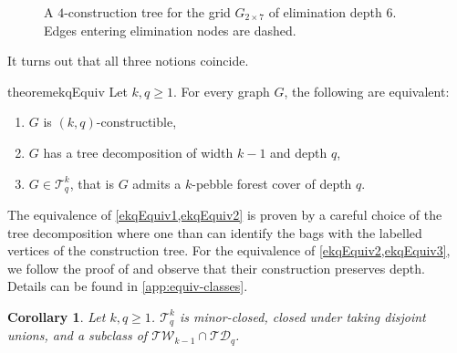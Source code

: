 \documentclass[10pt,a4paper]{article}
\newtheorem{corollary}[theorem]{Corollary}
\newcommand{\TW}{\ensuremath{\mathcal{TW}}}
\newcommand{\TD}{\ensuremath{\mathcal{TD}}}
\newcommand{\Ekq}{\ensuremath{\mathcal{T}_{q}^{k}}}
\newcommand{\elimOrd}[2]{$(#1,#2)$-constructible}
\newcommand{\grid}[2]{\ensuremath{G_{#1 \times #2}}}
\begin{document}
\begin{figure}
	\caption{A $4$-construction tree for the grid $\grid{2}{7}$ of elimination depth $6$. Edges entering elimination nodes are dashed.}
	\label{fig:elim-example}
\end{figure}

 
It turns out that all three notions coincide.

\begin{restatable}{theorem}{ekqEquiv}
	\label{thm:Ekq_equiv}
	Let $k, q\geq 1$. For every graph $G$, the following are equivalent:
	\begin{enumerate}
		\item $G$ is \elimOrd{k}{q},\label{ekqEquiv1}
		\item $G$ has a tree decomposition of width $k-1$ and depth $q$,\label{ekqEquiv2}
		\item $G\in\Ekq$, that is $G$ admits a $k$-pebble forest cover of depth $q$.\label{ekqEquiv3}
	\end{enumerate}
\end{restatable}

The equivalence of \cref{ekqEquiv1,ekqEquiv2} is proven by a careful choice of the tree decomposition where one than can identify the bags with the labelled vertices of the construction tree. For the equivalence of \cref{ekqEquiv2,ekqEquiv3}, we follow the proof of \cite[Theorem~19]{abramsky_relating_2021} and observe that their construction preserves depth. Details can be found in \cref{app:equiv-classes}.

\begin{corollary}
	\label{cor:Ekq-subset-tw-td}
	\label{cor:minor-closed}
	Let $k, q\geq 1$.
	$\Ekq $ is minor-closed, closed under taking disjoint unions, and a subclass of $\TW_{k-1}\cap\TD_q$.
\end{corollary}
\end{document}
